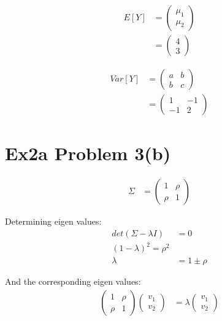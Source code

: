 \documentclass[a4paper]{article}
\begin{document}
\begin{align*}
E[Y] & = \begin{pmatrix}
\mu_1\\
\mu_2
\end{pmatrix}\\
&= \begin{pmatrix}
4\\
3
\end{pmatrix}
\end{align*}

\begin{align*}
Var[Y] & = \begin{pmatrix}
a & b\\
b & c
\end{pmatrix}\\
&= \begin{pmatrix}
1 & -1\\
-1 & 2
\end{pmatrix}
\end{align*}



\section*{Ex2a Problem 3(b)}
\begin{align*}
\Sigma &= \begin{pmatrix}
1 & \rho \\ 
\rho & 1
\end{pmatrix}
\end{align*}

Determining eigen values:
\begin{align*}
det(\Sigma-\lambda I) &=0 \\
(1-\lambda)^2 = \rho^2 \\
\lambda &= 1\pm \rho
\end{align*}

And the corresponding eigen values:
\begin{align*}
\begin{pmatrix}
1 & \rho \\ 
\rho & 1
\end{pmatrix}\begin{pmatrix} v_1 \\ v_2  \end{pmatrix} &= \lambda \begin{pmatrix}
v_1\\ v_2
\end{pmatrix}
\end{align*}
\end{document}
